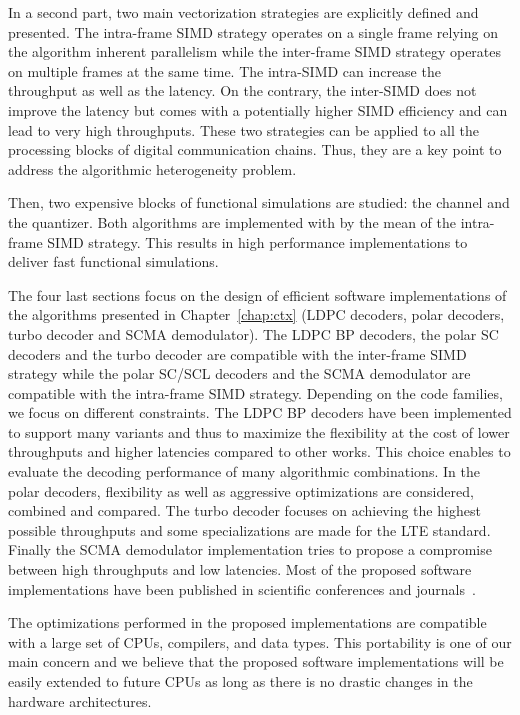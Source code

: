 In a second part, two main vectorization strategies are explicitly defined and
presented. The intra-frame SIMD strategy operates on a single frame relying
on the algorithm inherent parallelism while the inter-frame SIMD strategy
operates on multiple frames at the same time. The intra-SIMD can increase the
throughput as well as the latency. On the contrary, the inter-SIMD does not
improve the latency but comes with a potentially higher SIMD efficiency and can
lead to very high throughputs. These two strategies can be applied to all the
processing blocks of digital communication chains. Thus, they are a key point to
address the algorithmic heterogeneity problem.

Then, two expensive blocks of functional simulations are studied: the channel
and the quantizer. Both algorithms are implemented with \MIPP by the mean of the
intra-frame SIMD strategy. This results in high performance implementations to
deliver fast functional simulations.

The four last sections focus on the design of efficient software implementations
of the algorithms presented in Chapter~\ref{chap:ctx} (LDPC decoders, polar
decoders, turbo decoder and SCMA demodulator). The LDPC BP decoders, the polar
SC decoders and the turbo decoder are compatible with the inter-frame SIMD
strategy while the polar SC/SCL decoders and the SCMA demodulator are
compatible with the intra-frame SIMD strategy. Depending on the code families,
we focus on different constraints. The LDPC BP decoders have been implemented to
support many variants and thus to maximize the flexibility at the cost of lower
throughputs and higher latencies compared to other works. This choice enables to
evaluate the decoding performance of many algorithmic combinations. In the polar
decoders, flexibility as well as aggressive optimizations are considered,
combined and compared. The turbo decoder focuses on achieving the highest
possible throughputs and some specializations are made for the LTE standard.
Finally the SCMA demodulator implementation tries to propose a compromise
between high throughputs and low latencies. Most of the proposed software
implementations have been published in scientific conferences and
journals~\cite{Ghaffari2019,Leonardon2019,Cassagne2015c,Cassagne2016b,
Cassagne2016a}.

The optimizations performed in the proposed implementations are compatible with
a large set of CPUs, compilers, and data types. This portability is one of our
main concern and we believe that the proposed software implementations will be
easily extended to future CPUs as long as there is no drastic changes in the
hardware architectures.

